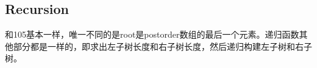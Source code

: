 \subsection{Recursion}
和105基本一样，唯一不同的是root是postorder数组的最后一个元素。递归函数其他部分都是一样的，即求出左子树长度和右子树长度，然后递归构建左子树和右子树。
